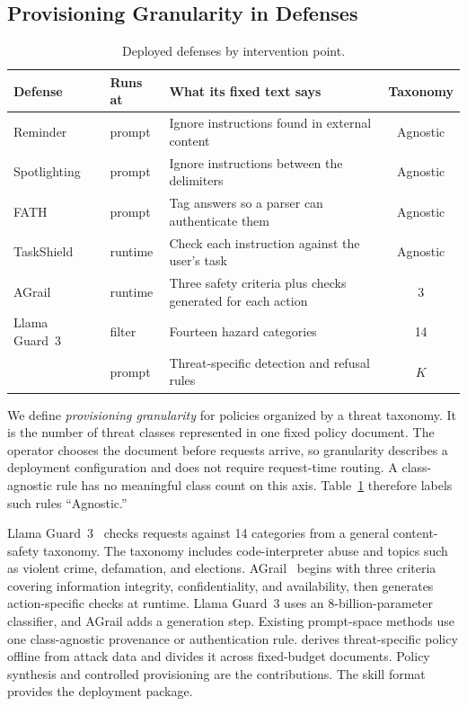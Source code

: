 \subsection{Provisioning Granularity in Defenses}
\label{sec:rel-granularity}

\begin{table}[t]
\centering
\footnotesize
\setlength{\tabcolsep}{3pt}
\caption{Deployed defenses by intervention point.}
\label{tab:granularity-survey}
\begin{tabular}{@{}llp{2.85cm}c@{}}
\toprule
\textbf{Defense} & \textbf{Runs at} & \textbf{What its fixed text says} & \textbf{Taxonomy} \\
\midrule
Reminder~\cite{yi2025benchmarking}      & prompt  & Ignore instructions found in external content & Agnostic \\
Spotlighting~\cite{hines2024defending} & prompt  & Ignore instructions between the delimiters    & Agnostic \\
FATH~\cite{wang2024fath}               & prompt  & Tag answers so a parser can authenticate them  & Agnostic \\
TaskShield~\cite{jia2025task}          & runtime & Check each instruction against the user's task & Agnostic \\
AGrail~\cite{luo2025agrail}            & runtime & Three safety criteria plus checks generated for each action & 3 \\
Llama Guard~3~\cite{metallamaguard3}   & filter  & Fourteen hazard categories                     & 14 \\
\midrule
\sysname{}                              & prompt  & Threat-specific detection and refusal rules    & $K$ \\
\bottomrule
\end{tabular}
\vspace{-0.2in}
\end{table}

We define \emph{provisioning granularity} for policies organized by a threat taxonomy. It is the number of threat classes represented in one fixed policy document. The operator chooses the document before requests arrive, so granularity describes a deployment configuration and does not require request-time routing. A class-agnostic rule has no meaningful class count on this axis. Table~\ref{tab:granularity-survey} therefore labels such rules ``Agnostic.''

Llama Guard~3~\cite{metallamaguard3} checks requests against 14 categories from a general content-safety taxonomy. The taxonomy includes code-interpreter abuse and topics such as violent crime, defamation, and elections. AGrail~\cite{luo2025agrail} begins with three criteria covering information integrity, confidentiality, and availability, then generates action-specific checks at runtime. Llama Guard~3 uses an 8-billion-parameter classifier, and AGrail adds a generation step. Existing prompt-space methods use one class-agnostic provenance or authentication rule. \sysname derives threat-specific policy offline from attack data and divides it across fixed-budget documents. Policy synthesis and controlled provisioning are the contributions. The skill format provides the deployment package.
